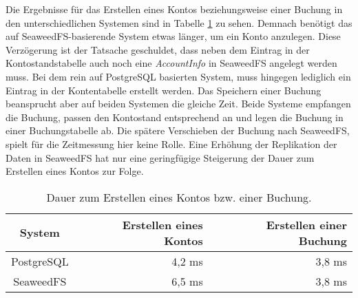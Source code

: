\documentclass[12pt,oneside,a4paper,parskip]{scrbook}
\begin{document}
Die Ergebnisse für das Erstellen eines Kontos beziehungsweise einer Buchung in den unterschiedlichen Systemen sind in Tabelle \ref{tab:create} zu sehen. Demnach benötigt das auf SeaweedFS-basierende System etwas länger, um ein Konto anzulegen. Diese Verzögerung ist der Tatsache geschuldet, dass neben dem Eintrag in der Kontostandstabelle auch noch eine \textit{AccountInfo} in SeaweedFS angelegt werden muss. Bei dem rein auf PostgreSQL basierten System, muss hingegen lediglich ein Eintrag in der Kontentabelle erstellt werden. Das Speichern einer Buchung beansprucht aber auf beiden Systemen die gleiche Zeit. Beide Systeme empfangen die Buchung, passen den Kontostand entsprechend an und legen die Buchung in einer Buchungstabelle ab. Die spätere Verschieben der Buchung nach SeaweedFS, spielt für die Zeitmessung hier keine Rolle. Eine Erhöhung der Replikation der Daten in SeaweedFS hat nur eine geringfügige Steigerung der Dauer zum Erstellen eines Kontos zur Folge.

\begin{table}[h]
\caption{Dauer zum Erstellen eines Kontos bzw. einer Buchung.} %
\centering %
\begin{tabular}{c rr} 
\hline\hline %
System & Erstellen eines Kontos & Erstellen einer Buchung  \\ [0.5ex]
\hline %
PostgreSQL & 4,2 ms& 3,8 ms\\ %
SeaweedFS  & 6,5 ms& 3,8 ms\\
\hline %
\end{tabular}
\label{tab:create}
\end{table}
\end{document}
